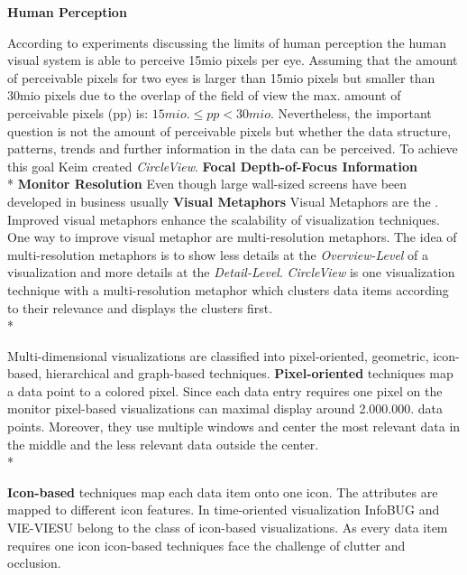\textbf{Human Perception} 

According to experiments discussing the limits of human perception \cite{Deering1998} the human visual system is able to perceive 15mio pixels per eye. Assuming that the amount of perceivable pixels for two eyes is larger than 15mio pixels but smaller than 30mio pixels due to the overlap of the field of view the max. amount of perceivable pixels (pp) is:
\begin{math}
15 mio. \leq pp < 30 mio.
\end{math}
Nevertheless, the important question is not the amount of perceivable pixels but whether the data structure, patterns, trends and further information in the data can be perceived. To achieve this goal Keim\cite{Keim2005} created \textit{CircleView}.
\textbf{Focal Depth-of-Focus Information}
\\*
\textbf{Monitor Resolution}
Even though large wall-sized screens have been developed in business usually 
\textbf{Visual Metaphors}
Visual Metaphors are the    . Improved visual metaphors enhance the scalability of visualization techniques\cite{Eick2002}. One way to improve visual metaphor are multi-resolution metaphors\cite{Keim2005}. The idea of multi-resolution metaphors is to show less details at the \textit{Overview-Level} of a visualization and more details at the \textit{Detail-Level}. \textit{CircleView} is one visualization technique with a multi-resolution metaphor which clusters data items according to their relevance and displays the clusters first.
\\*

Multi-dimensional visualizations are classified into pixel-oriented, geometric, icon-based, hierarchical and graph-based techniques\cite{Keim2000}.
\textbf{Pixel-oriented} techniques map a data point to a colored pixel. Since each data entry requires one pixel on the monitor pixel-based visualizations can maximal display around 2.000.000. data points. Moreover, they use multiple windows and center the most relevant data in the middle and the less relevant data outside the center\cite{Keim1996}.\\*

\textbf{Icon-based} techniques map each data item onto one icon. The attributes are mapped to different icon features\cite{Keim2001}. In time-oriented visualization InfoBUG and VIE-VIESU belong to the class of icon-based visualizations. As every data item requires one icon icon-based techniques face the challenge of clutter and occlusion\cite{Borgo2013}.


